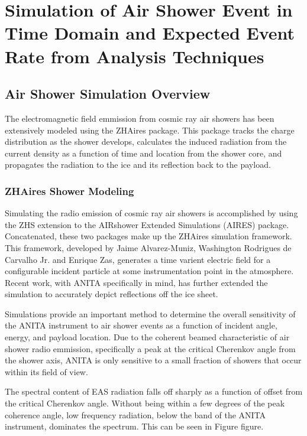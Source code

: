\chapter{Simulation of Air Shower Event in Time Domain and Expected Event Rate from Analysis Techniques}

%
%
%
%
%
%



\section{Air Shower Simulation Overview}
	The electromagnetic field emmission from cosmic ray air showers has been extensively modeled using the ZHAires package.  This package tracks the charge distribution as the shower develops, calculates the induced radiation from the current density as a function of time and location from the shower core, and propagates the radiation to the ice and its reflection back to the payload.  
	
	\subsection{ZHAires Shower Modeling}
		Simulating the radio emission of cosmic ray air showers is accomplished by using the ZHS extension to the AIRshower Extended Simulations (AIRES) package.\cite{AlvarezMuñiz2012325}  Concatenated, these two packages make up the ZHAires simulation framework.  This framework, developed by Jaime Alvarez-Muniz, Washington Rodrigues de Carvalho Jr. and Enrique Zas, generates a time varient electric field for a configurable incident particle at some instrumentation point in the atmosphere.  Recent work, with ANITA specifically in mind, has further extended the simulation to accurately depict reflections off the ice sheet.
		
		Simulations provide an important method to determine the overall sensitivity of the ANITA instrument to air shower events as a function of incident angle, energy, and payload location.  Due to the coherent beamed characteristic of air shower radio emmission, specifically a peak at the critical Cherenkov angle from the shower axis, ANITA is only sensitive to a small fraction of showers that occur within its field of view.
		
		The spectral content of EAS radiation falls off sharply as a function of offset from the critical Cherenkov angle.  Without being within a few degrees of the peak coherence angle, low frequency radiation, below the band of the ANITA instrument, dominates the spectrum.  This can be seen in Figure figure.  
		
